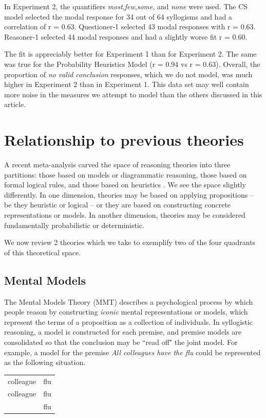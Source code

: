 \documentclass[10pt,letterpaper]{article}
\begin{document}
In Experiment 2, the quantifiers \emph{most},\emph{few},\emph{some}, and \emph{none} were used. The CS model selected the modal response for 34 out of 64 syllogisms and had a correlation of r = 0.63. Questioner-1 selected 43 modal responses with  r = 0.63. Reasoner-1 selected 44 modal responses and had a slightly worse fit r = 0.60. 

The fit is appreciably better for Experiment 1 than for Experiment 2. The same was true for the Probability Heuristics Model (r = 0.94 vs r = 0.63). Overall, the proportion of \emph{no valid conclusion} responses, which we do not model, was much higher in Experiment 2 than in Experiment 1. This data set may well contain more noise in the measures we attempt to model than the others discussed in this article. 

\section{Relationship to previous theories}

A recent meta-analysis carved the space of reasoning theories into three partitions: those based on models or diagrammatic reasoning, those based on formal logical rules, and those based on heuristics \cite{Khemlani2012}. We see the space slightly differently. In one dimension, theories may be based on applying propositions -- be they heuristic or logical -- or they are based on constructing concrete representations or models. In another dimension, theories may be considered fundamentally probabilistic or deterministic. 

We now review 2 theories which we take to exemplify two of the four quadrants of this theoretical space. 

\subsection{Mental Models}
 The Mental Models Theory (MMT) describes a psychological process by which people reason by constructing {\em iconic} mental representations or models, which represent the terms of a proposition as a collection of individuals. In syllogistic reasoning, a model is constructed for each premise, and premise models are consolidated so that the conclusion may be ``read off" the joint model. For example, a model for the premise  \emph{All colleagues have the flu} could be represented as the following situation.

\begin{tabular}{l l}
colleague & flu\\
colleague & flu\\
 & flu\\
\end{tabular}
\end{document}
